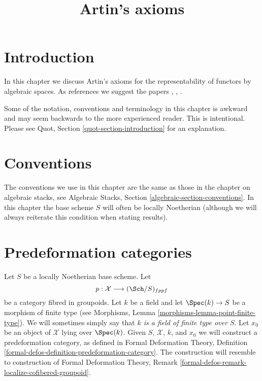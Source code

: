 

%


\title{Artin's axioms}

\maketitle

\label{section-phantom}

\tableofcontents




\section{Introduction}
\label{section-introduction}

\noindent
In this chapter we discuss Artin's axioms for the representability of
functors by algebraic spaces. As references we suggest the papers
\cite{ArtinI}, \cite{ArtinII}, \cite{ArtinVersal}.

\medskip\noindent
Some of the notation, conventions and terminology in this chapter is awkward
and may seem backwards to the more experienced reader. This is intentional.
Please see Quot, Section \ref{quot-section-introduction} for an
explanation.






\section{Conventions}
\label{section-conventions}

\noindent
The conventions we use in this chapter are the same as those in the
chapter on algebraic stacks, see
Algebraic Stacks, Section \ref{algebraic-section-conventions}.
In this chapter the base scheme $S$ will often be locally Noetherian
(although we will always reiterate this condition when stating
results).





\section{Predeformation categories}
\label{section-predeformation-categories}

\noindent
Let $S$ be a locally Noetherian base scheme. Let
$$
p : \mathcal{X} \longrightarrow (\Sch/S)_{fppf}
$$
be a category fibred in groupoids. Let $k$ be a field
and let $\Spec(k) \to S$ be a morphism of finite type (see
Morphisms, Lemma \ref{morphisms-lemma-point-finite-type}). We will sometimes
simply say that {\it $k$ is a field of finite type over $S$}. Let
$x_0$ be an object of $\mathcal{X}$ lying over $\Spec(k)$.
Given $S$, $\mathcal{X}$, $k$, and $x_0$ we will construct a
predeformation category, as defined in 
Formal Deformation Theory,
Definition \ref{formal-defos-definition-predeformation-category}.
The construction will resemble to construction of
Formal Deformation Theory,
Remark \ref{formal-defos-remark-localize-cofibered-groupoid}.

